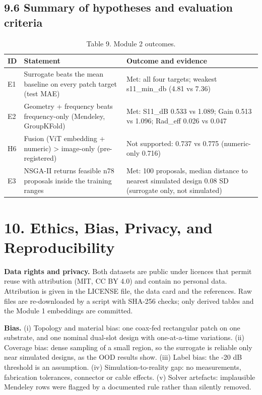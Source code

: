 \documentclass[11pt,a4paper]{article}
\begin{document}
\subsection*{9.6 Summary of hypotheses and evaluation criteria}
\begin{table}[H]\centering\small
\caption*{Table 9. Module 2 outcomes.}
\begin{tabularx}{\linewidth}{XXX}
\toprule
\textbf{ID} & \textbf{Statement} & \textbf{Outcome and evidence} \\
\midrule
E1 & Surrogate beats the mean baseline on every patch target (test MAE) & Met: all four targets; weakest s11\_min\_db (4.81 vs 7.36) \\
E2 & Geometry + frequency beats frequency-only (Mendeley, GroupKFold) & Met: S11\_dB 0.533 vs 1.089; Gain 0.513 vs 1.096; Rad\_eff 0.026 vs 0.047 \\
H6 & Fusion (ViT embedding + numeric) > image-only (pre-registered) & Not supported: 0.737 vs 0.775 (numeric-only 0.716) \\
E3 & NSGA-II returns feasible n78 proposals inside the training ranges & Met: 100 proposals, median distance to nearest simulated design 0.08 SD (surrogate only, not simulated) \\
\bottomrule
\end{tabularx}
\end{table}
\section*{10. Ethics, Bias, Privacy, and Reproducibility}
\textbf{Data rights and privacy.} Both datasets are public under licences that permit reuse with attribution (MIT, CC BY 4.0) and contain no personal data. Attribution is given in the LICENSE file, the data card and the references. Raw files are re-downloaded by a script with SHA-256 checks; only derived tables and the Module 1 embeddings are committed.

\textbf{Bias.} (i) Topology and material bias: one coax-fed rectangular patch on one substrate, and one nominal dual-slot design with one-at-a-time variations. (ii) Coverage bias: dense sampling of a small region, so the surrogate is reliable only near simulated designs, as the OOD results show. (iii) Label bias: the -20 dB threshold is an assumption. (iv) Simulation-to-reality gap: no measurements, fabrication tolerances, connector or cable effects. (v) Solver artefacts: implausible Mendeley rows were flagged by a documented rule rather than silently removed.
\end{document}
